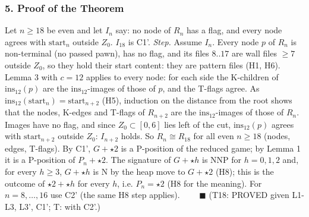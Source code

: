 \subsubsection*{5. Proof of the Theorem}
Let $n\ge18$ be even and let $I_n$ say: no node of $R_n$ has a flag, and every node agrees with $\mathrm{start}_n$ outside $Z_0$. $I_{18}$ is C1'. \emph{Step.} Assume $I_n$. Every node $p$ of $R_n$ is non-terminal (no passed pawn), has no flag, and its files $8..17$ are wall files $\ge7$ outside $Z_0$, so they hold their start content: they are pattern files (H1, H6). Lemma 3 with $c=12$ applies to every node: for each side the K-children of $\mathrm{ins}_{12}(p)$ are the $\mathrm{ins}_{12}$-images of those of $p$, and the T-flags agree. As $\mathrm{ins}_{12}(\mathrm{start}_n)=\mathrm{start}_{n+2}$ (H5), induction on the distance from the root shows that the nodes, K-edges and T-flags of $R_{n+2}$ are the $\mathrm{ins}_{12}$-images of those of $R_n$. Images have no flag, and since $Z_0\subset[0,6]$ lies left of the cut, $\mathrm{ins}_{12}(p)$ agrees with $\mathrm{start}_{n+2}$ outside $Z_0$: $I_{n+2}$ holds. So $R_n\cong R_{18}$ for all even $n\ge18$ (nodes, edges, T-flags). By C1', $G+\star2$ is a P-position of the reduced game; by Lemma 1 it is a P-position of $P_n+\star2$. The signature of $G+\star h$ is NNP for $h=0,1,2$ and, for every $h\ge3$, $G+\star h$ is N by the heap move to $G+\star2$ (H8); this is the outcome of $\star2+\star h$ for every $h$, i.e. $P_n=\star2$ (H8 for the meaning). For $n=8,\dots,16$ use C2' (the same H8 step applies). $\qquad\blacksquare$ (T18: PROVED given L1-L3, L3', C1'; T: with C2'.)

